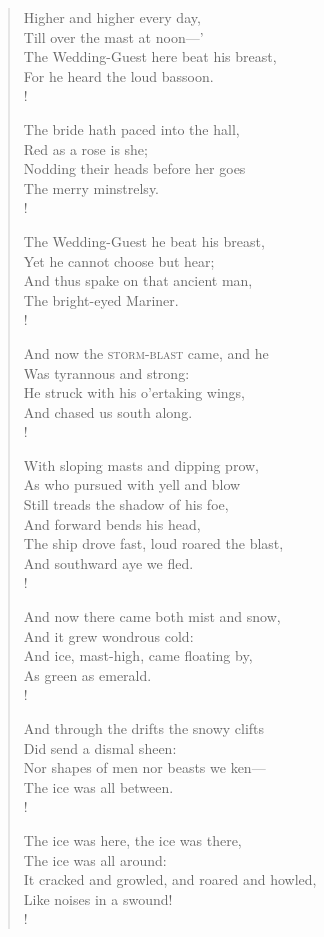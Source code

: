\documentclass[11pt,twoside]{book}
\begin{document}
\begin{verse}
Higher and higher every day, \\
Till over the mast at noon—' \\
The Wedding-Guest here beat his breast, \\
For he heard the loud bassoon. \\!

The bride hath paced into the hall, \\
Red as a rose is she; \\
Nodding their heads before her goes \\
The merry minstrelsy. \\!

The Wedding-Guest he beat his breast, \\
Yet he cannot choose but hear; \\
And thus spake on that ancient man, \\
The bright-eyed Mariner. \\!

And now the \textsc{storm-blast} came, and he \\
Was tyrannous and strong: \\
He struck with his o'ertaking wings, \\
And chased us south along. \\!

With sloping masts and dipping prow, \\
As who pursued with yell and blow \\
Still treads the shadow of his foe, \\
And forward bends his head, \\
The ship drove fast, loud roared the blast, \\
And southward aye we fled. \\!

And now there came both mist and snow, \\
And it grew wondrous cold: \\
And ice, mast-high, came floating by, \\
As green as emerald. \\!

And through the drifts the snowy clifts \\
Did send a dismal sheen: \\
Nor shapes of men nor beasts we ken— \\
The ice was all between. \\!

The ice was here, the ice was there, \\
The ice was all around: \\
It cracked and growled, and roared and howled, \\
Like noises in a swound! \\!


\end{verse}
\end{document}
